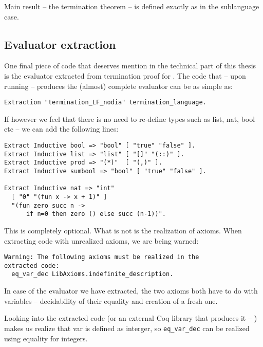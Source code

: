 Main result -- the termination theorem -- is defined exactly as in the sublanguage case.

\subsection{Evaluator extraction}

One final piece of code that deserves mention in the technical part of this thesis is the evaluator extracted from termination proof for \nodiaLangLF{}. The code that -- upon running -- produces the (almost) complete evaluator can be as simple as:
\begin{verbatim}
Extraction "termination_LF_nodia" termination_language.
\end{verbatim}

If however we feel that there is no need to re-define types such as list, nat, bool etc -- we can add the following lines:
\begin{verbatim}
Extract Inductive bool => "bool" [ "true" "false" ].
Extract Inductive list => "list" [ "[]" "(::)" ].
Extract Inductive prod => "(*)"  [ "(,)" ].
Extract Inductive sumbool => "bool" [ "true" "false" ].

Extract Inductive nat => "int"
  [ "0" "(fun x -> x + 1)" ]
  "(fun zero succ n ->
      if n=0 then zero () else succ (n-1))".
\end{verbatim}

This is completely optional. What is not is the realization of axioms. When extracting code with unrealized axioms, we are being warned:
\begin{verbatim}
Warning: The following axioms must be realized in the 
extracted code:
  eq_var_dec LibAxioms.indefinite_description.
\end{verbatim}

In case of the evaluator we have extracted, the two axioms both have to do with variables -- decidability of their equality and creation of a fresh one. 

Looking into the extracted code (or an external Coq library that produces it -- \tlc{}) makes us realize that var is defined as interger, so \verb|eq_var_dec| can be realized using equality for integers. 

